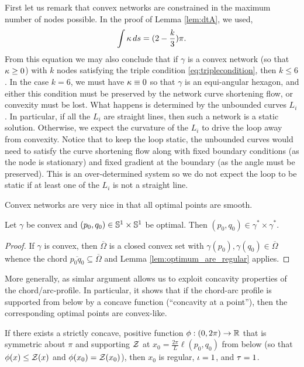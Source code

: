 \documentclass[11pt]{amsart}
\begin{document}
\begin{remark}
First let us remark that convex networks are constrained in the maximum number of nodes possible. In the proof of Lemma \ref{lem:dtA}, we used,
\[
\int \operatorname{\kappa} ds = (2 - \frac{k}{3}) \pi.
\]
From this equation we may also conclude that if \(\gamma\) is a convex network (so that \(\operatorname{\kappa} \geq 0\)) with \(k\) nodes satisfying the triple condition \eqref{eq:triplecondition}, then \(k \leq 6\). In the case \(k = 6\), we must have \(\operatorname{\kappa} \equiv 0\) so that \(\gamma\) is an equi-angular hexagon, and either this condition must be preserved by the network curve shortening flow, or convexity must be lost. What happens is determined by the unbounded curves \(L_i\). In particular, if all the \(L_i\) are straight lines, then such a network is a static solution. Otherwise, we expect the curvature of the \(L_i\) to drive the loop away from convexity. Notice that to keep the loop static, the unbounded curves would need to satisfy the curve shortening flow along with fixed boundary conditions (as the node is stationary) and fixed gradient at the boundary (as the angle must be preserved). This is an over-determined system so we do not expect the loop to be static if at least one of the \(L_i\) is not a straight line.
\end{remark}

Convex networks are very nice in that all optimal points are smooth.

\begin{lemma}
\label{lem:convex_regular}

Let \(\gamma\) be convex and \((p_0,q_0) \in \mathbb{S}^1 \times \mathbb{S}^1\) be optimal. Then \((p_0, q_0) \in \gamma^{\ast} \times \gamma^{\ast}\).
\end{lemma}

\begin{proof}
If $\gamma$ is convex, then $\overline{\Omega}$ is a closed convex set with $\gamma(p_0), \gamma(q_0) \in \overline{\Omega}$ whence the chord $\overline{p_0q_0} \subseteq \overline{\Omega}$ and Lemma \ref{lem:optimum_are_regular} applies.
\end{proof}

More generally, as simlar argument allows us to exploit concavity properties of the chord/arc-profile. In particular, it shows that if the chord-arc profile is supported from below by a concave function (``concavity at a point''), then the corresponding optimal points are convex-like.

\begin{lemma}
\label{lem:concave_barrier}
If there exists a strictly concave, positive function $\phi: (0, 2\pi) \to \mathbb{R}$ that is symmetric about $\pi$ and supporting $\operatorname{\mathcal{Z}}$ at $x_0=\tfrac{2\pi}{L} \ell(p_0,q_0)$ from below (so that $\phi(x) \leq \operatorname{\mathcal{Z}}(x)$ and $\phi(x_0)=\operatorname{\mathcal{Z}}(x_0)$), then $x_0$ is regular, $\operatorname{\iota} = 1$, and $\operatorname{\tau} = 1$.
\end{lemma}
\end{document}

